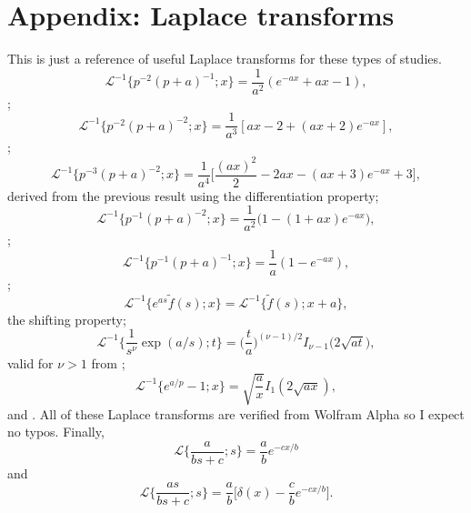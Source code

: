 \documentclass[11pt]{article}
\newcommand\be{\begin{equation}} %
\newcommand\ee{\end{equation}}   %
\newcommand\El{\mathcal{L}}
\begin{document}
\section*{Appendix: Laplace transforms}
This is just a reference of useful Laplace transforms for these types of studies.
\be \El^{-1}\Big\{p^{-2}(p+a)^{-1};x\Big\} = \frac{1}{a^2}(e^{-ax}+ax-1),\ee
\citep[][2.1.2.33]{Prudnikov1986};
\be \El^{-1}\Big\{p^{-2}(p+a)^{-2};x\Big\} = \frac{1}{a^3}[ax - 2 + (ax+2)e^{-ax}],\ee
\citep[][2.1.2.49]{Prudnikov1986};
\be \El^{-1}\Big\{p^{-3}(p+a)^{-2};x\Big\} = \frac{1}{a^4}\Big[\frac{(ax)^2}{2} - 2ax - (ax+3)e^{-ax} + 3\Big], \ee
derived from the previous result using the differentiation property;
\be \El^{-1}\Big\{p^{-1}(p+a)^{-2};x\Big\} = \frac{1}{a^2}\Big(1 -(1+ax)e^{-ax}\Big),\ee
\citep[][2.1.2.47]{Prudnikov1986};
\be \El^{-1}\Big\{p^{-1}(p+a)^{-1};x\Big\} = \frac{1}{a}(1-e^{-ax}),\ee
\citep[][2.1.2.31]{Prudnikov1986};
\be\El^{-1} \{e^{as}\tilde{f}(s);x\} = \El^{-1}\{\tilde{f}(s);x+a\},\ee
the shifting property;
\be \El^{-1}\big\{\frac{1}{s^\nu}\exp(a/s);t\} = \Big(\frac{t}{a}\Big)^{(\nu-1)/2}I_{\nu-1}\big(2\sqrt{a t}\big), \ee
valid for $\nu>1$ from \citep[][2.2.2.1]{Prudnikov1986};
\be \El^{-1}\{e^{a/p}-1;x\} = \sqrt{\frac{a}{x}}I_1(2\sqrt{ax}),\ee
and \citep[][2.2.2.8]{Prudnikov1986}.
All of these Laplace transforms are verified from Wolfram Alpha so I expect no typos.
Finally,
\be \El\Big\{\frac{a}{bs+c};s\Big\} = \frac{a}{b}e^{-cx/b}\ee
and
\be \El\Big\{\frac{as}{bs+c};s\Big\} = \frac{a}{b}\Big[\delta(x) - \frac{c}{b}e^{-cx/b}\Big].\ee

\end{document}
